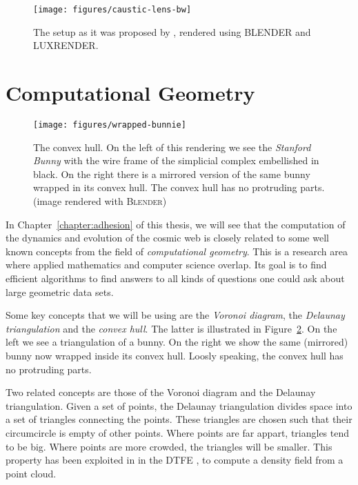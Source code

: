 \begin{figure}[ht]
\centering
\texttt{[image: figures/caustic-lens-bw]}
\caption{The setup as it was proposed by \citet{Shandarin1989}, rendered using
{\small BLENDER} and {\small LUXRENDER}. }
\label{fig:caustic-lens}
\end{figure}

\clearpage
\section{Computational Geometry}\label{section:computationalgeometry}
\begin{figure}[ht]
    \centering
    \texttt{[image: figures/wrapped-bunnie]}
    \caption{The convex hull. On the left of this rendering we see the \emph{Stanford Bunny} with the wire frame of the simplicial complex embellished in black. On the right there is a mirrored version of the same bunny wrapped in its convex hull. The convex hull has no protruding parts. (image rendered with \textsc{Blender})} \label{fig:convexbunny}
\end{figure}

In Chapter~\ref{chapter:adhesion} of this thesis, we will see that the computation of the dynamics and evolution of the cosmic web is closely related to some well known concepts from the field of \emph{computational geometry}. This is a research area where applied mathematics and computer science overlap. Its goal is to find efficient algorithms to find answers to all kinds of questions one could ask about large geometric data sets.

Some key concepts that we will be using are the \emph{Voronoi diagram}, the \emph{Delaunay triangulation} and the \emph{convex hull}. The latter is illustrated in Figure~\ref{fig:convexbunny}. On the left we see a triangulation of a bunny. On the right we show the same (mirrored) bunny now wrapped inside its convex hull. Loosly speaking, the convex hull has no protruding parts.

Two related concepts are those of the Voronoi diagram and the Delaunay triangulation. Given a set of points, the Delaunay triangulation divides space into a set of triangles connecting the points. These triangles are chosen such that their circumcircle is empty of other points. Where points are far appart, triangles tend to be big. Where points are more crowded, the triangles will be smaller. This property has been exploited in in the \ac{DTFE} \citep{Schaap2000}, to compute a density field from a point cloud.

